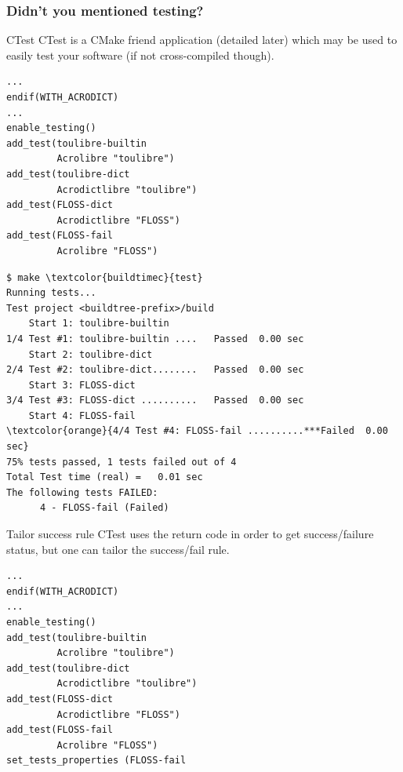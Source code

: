 \documentclass[compress,slidestop,table,usepdftitle=false
              ]
               {beamer}
\begin{document}
\begin{frame}
\frametitle{Didn't you mentioned testing?}
\vspace*{-0.4cm}
\begin{block}{CTest}
CTest is a CMake friend application (detailed later) which may be used to
easily test your software (if not cross-compiled though).
\end{block}
\vspace*{-0.7cm}
\begin{multicols}{2}
\begin{lstlisting}[escapechar={§},basicstyle=\tiny,caption=add CTest support]
...
endif(WITH_ACRODICT)
...
enable_testing()
add_test(toulibre-builtin
         Acrolibre "toulibre")
add_test(toulibre-dict
         Acrodictlibre "toulibre")
add_test(FLOSS-dict
         Acrodictlibre "FLOSS")
add_test(FLOSS-fail
         Acrolibre "FLOSS")
\end{lstlisting}
\columnbreak
\begin{Verbatim}[commandchars=\\\{\},fontsize=\tiny]
$ make \textcolor{buildtimec}{test}
Running tests...
Test project <buildtree-prefix>/build
    Start 1: toulibre-builtin
1/4 Test #1: toulibre-builtin ....   Passed  0.00 sec
    Start 2: toulibre-dict
2/4 Test #2: toulibre-dict........   Passed  0.00 sec
    Start 3: FLOSS-dict
3/4 Test #3: FLOSS-dict ..........   Passed  0.00 sec
    Start 4: FLOSS-fail
\textcolor{orange}{4/4 Test #4: FLOSS-fail ..........***Failed  0.00 sec}
75% tests passed, 1 tests failed out of 4
Total Test time (real) =   0.01 sec
The following tests FAILED:
	  4 - FLOSS-fail (Failed)
\end{Verbatim}
\end{multicols}
\vspace*{-0.4cm}
\begin{block}{Tailor success rule}
CTest uses the return code in order to get success/failure status, but
one can tailor the success/fail rule.
\end{block}
\vspace*{-0.7cm}
\begin{multicols}{2}
\begin{lstlisting}[escapechar={§},basicstyle=\tiny,caption=add CTest support]
...
endif(WITH_ACRODICT)
...
enable_testing()
add_test(toulibre-builtin
         Acrolibre "toulibre")
add_test(toulibre-dict
         Acrodictlibre "toulibre")
add_test(FLOSS-dict
         Acrodictlibre "FLOSS")
add_test(FLOSS-fail
         Acrolibre "FLOSS")
set_tests_properties (FLOSS-fail

\end{lstlisting}
\end{multicols}
\end{frame}
\end{document}
